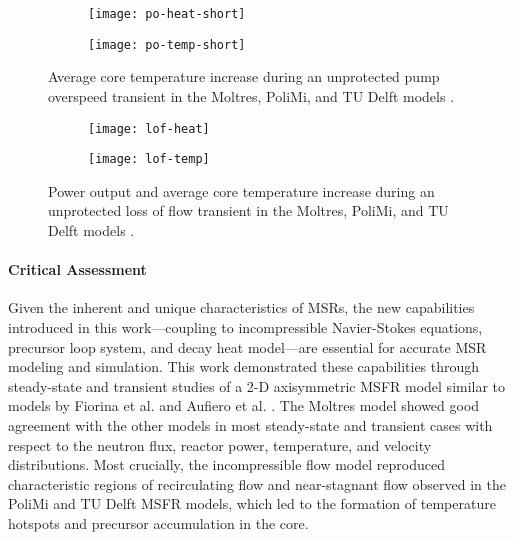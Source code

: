 \begin{figure}[htb!]
    \centering
    \begin{subfigure}[t]{.485\textwidth}
        \centering
        \texttt{[image: po-heat-short]}
    \end{subfigure}
    \hfill
    \begin{subfigure}[t]{.485\textwidth}
        \centering
        \texttt{[image: po-temp-short]}
    \end{subfigure}
    \caption{Average core temperature increase during
    an unprotected pump overspeed transient in the Moltres, PoliMi, and
    TU Delft models \cite{fiorina_modelling_2014}.}
    \label{fig:poshort}
\end{figure}

\begin{figure}[htb!]
    \centering
    \begin{subfigure}[t]{.485\textwidth}
        \centering
        \texttt{[image: lof-heat]}
    \end{subfigure}
    \hfill
    \begin{subfigure}[t]{.485\textwidth}
        \centering
        \texttt{[image: lof-temp]}
    \end{subfigure}
    \caption{Power output and average core temperature increase during
    an unprotected loss of flow transient in the Moltres, PoliMi, and
    TU Delft models \cite{fiorina_modelling_2014}.}
    \label{fig:lof}
\end{figure}

\paragraph{Critical Assessment} \label{sec:msfr-critique}

Given the inherent and unique characteristics of \glspl{MSR}, the new
capabilities introduced in this work---coupling to incompressible Navier-Stokes
equations, precursor loop system, and decay heat model---are essential for
accurate \gls{MSR} modeling and simulation. This work demonstrated these
capabilities through steady-state and transient studies of a 2-D axisymmetric
\gls{MSFR} model similar to models by Fiorina et al.
\cite{fiorina_modelling_2014} and Aufiero et al.
\cite{aufiero_development_2014}. The Moltres model showed good agreement with
the other models in
most steady-state and transient cases with respect to the neutron flux, reactor
power, temperature, and velocity distributions. Most crucially, the
incompressible flow model reproduced characteristic regions of recirculating
flow and near-stagnant flow observed in the PoliMi and TU Delft \gls{MSFR}
models, which led to the formation of temperature hotspots and precursor
accumulation in the core.

